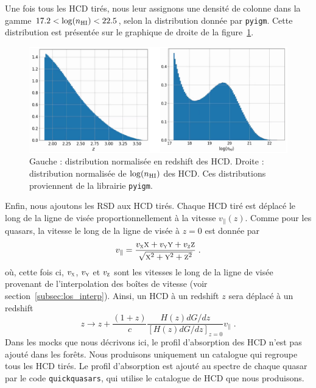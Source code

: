 \documentclass[11pt, twoside, a4paper, openright]{report}
\begin{document}
Une fois tous les HCD tirés, nous leur assignons une densité de colonne dans la gamme $\num{17.2} < \log(n_{\textsc{HI}}) < \num{22.5}$, selon la distribution donnée par \texttt{pyigm}. Cette distribution est présentée sur le graphique de droite de la figure~\ref{fig:distrib_dla}.
\begin{figure}
  \centering
  \includegraphics[scale=0.38]{distrib_dla}
  \caption{Gauche : distribution normalisée en redshift des HCD. Droite : distribution normalisée de $\log(n_{\textsc{HI}})$ des HCD. Ces distributions proviennent de la librairie \texttt{pyigm}.}
  \label{fig:distrib_dla}
\end{figure}
Enfin, nous ajoutons les RSD aux HCD tirés. Chaque HCD tiré est déplacé le long de la ligne de visée proportionnellement à la vitesse $v_{\parallel}(z)$. Comme pour les quasars, la vitesse le long de la ligne de visée à $z=0$ est donnée par
\begin{equation}
v_{\parallel} = \frac{v_{\textsc{x}} \textsc{x} + v_{\textsc{y}} \textsc{y} + v_{\textsc{z}} \textsc{z}}{\sqrt{\textsc{x}^2 + \textsc{y}^2 + \textsc{z}^2}} \; .
\end{equation}
où, cette fois ci, $v_{\textsc{x}}$, $v_{\textsc{y}}$ et $v_{\textsc{z}}$ sont les vitesses le long de la ligne de visée provenant de l'interpolation des boîtes de vitesse (voir section~\ref{subsec:los_interp}).
Ainsi, un HCD à un redshift $z$ sera déplacé à un redshift
\begin{equation}
  z \rightarrow  z + \frac{(1+z)}{c} \frac{H(z) dG/dz}{[H(z) dG/dz]_{z=0}} v_{\parallel} \; .
\end{equation}
Dans les mocks que nous décrivons ici, le profil d'absorption des HCD n'est pas ajouté dans les forêts. Nous produisons uniquement un catalogue qui regroupe tous les HCD tirés. Le profil d'absorption est ajouté au spectre de chaque quasar par le code \texttt{quickquasars}, qui utilise le catalogue de HCD que nous produisons.
\end{document}
